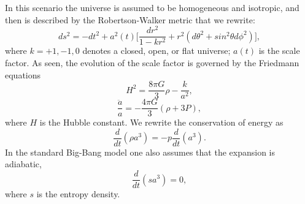 \documentclass[11pt,a4paper,twoside]{book}
\begin{document}
In this scenario the universe is assumed to be homogeneous and isotropic, and then is described by the Robertson-Walker metric that we rewrite:
\begin{equation}
	\label{metricCh2}	
	ds^{2}   = - dt^{2} + a^{2}(t)\Big[\frac{dr^{2}}{1-kr^{2}}  +  r^{2}(d\theta^{2} + sin^{2} \theta d\phi^{2})\Big], 
\end{equation}
where $ k=+1,-1,0 $ denotes a closed, open, or flat universe; $ a(t) $ is the scale factor.
As seen, the evolution of the scale factor is governed by the Friedmann equations
\begin{equation}
	\label{friedmannEquations1Chap2}
	H^{2}=\frac{8\pi G}{3}\rho - \frac{k}{a^{2}},
\end{equation}
\begin{equation}
	\label{friedmannEquations2Chap2}	
	\frac{\ddot{a}}{a} = -\frac{4\pi G}{3}(\rho + 3P),
\end{equation}
where $ H  $ is the Hubble constant. We rewrite the conservation of energy as
\begin{equation}
\label{Chap2:ConservationEnergy}
\frac{d}{dt}(\rho a^{3})=-p\frac{d}{dt}(a^{3}).
\end{equation}
In the standard Big-Bang model one also assumes that the expansion is adiabatic,
\begin{equation}
\label{Chap2:entropy1}
\frac{d}{dt}(sa^{3})=0,
\end{equation}
where $ s $ is the entropy density.
\end{document}
